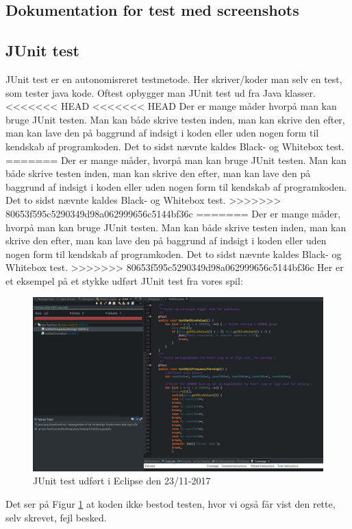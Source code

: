 \subsection{Dokumentation for test med screenshots}
    \subsection{JUnit test}
        JUnit test er en autonomisreret testmetode. Her skriver/koder man selv en test, som tester java kode. Oftest opbygger man JUnit test ud fra Java klasser.
<<<<<<< HEAD
<<<<<<< HEAD
        Der er mange måder hvorpå man kan bruge JUnit testen. Man kan både skrive testen inden, man kan skrive den efter, man kan lave den på baggrund af indsigt i koden eller uden nogen form til kendskab af programkoden. Det to sidst nævnte kaldes Black- og Whitebox test.
=======
        Der er mange måder, hvorpå man kan bruge JUnit testen. Man kan både skrive testen inden, man kan skrive den efter, man kan lave den på baggrund af indsigt i koden eller uden nogen form til kendskab af programkoden. Det to sidst nævnte kaldes Black- og Whitebox test.
>>>>>>> 80653f595c5290349d98a062999656c5144bf36c
=======
        Der er mange måder, hvorpå man kan bruge JUnit testen. Man kan både skrive testen inden, man kan skrive den efter, man kan lave den på baggrund af indsigt i koden eller uden nogen form til kendskab af programkoden. Det to sidst nævnte kaldes Black- og Whitebox test.
>>>>>>> 80653f595c5290349d98a062999656c5144bf36c
        Her er et eksempel på et stykke udført JUnit test fra vores spil:
            \begin{figure}[h]\label{fig:JUnitTest} %
                \advance\leftskip-3cm
                \includegraphics[width=20cm]{fig/JUnitTestDice.jpg}
                \caption{JUnit test udført i Eclipse den 23/11-2017}
            \end{figure}
        Det ser på Figur \ref{fig:JUnitTest} at koden ikke bestod testen, hvor vi også får vist den rette, selv skrevet, fejl besked.

